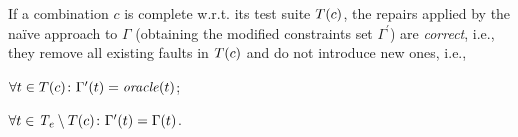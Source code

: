\begin{tikzborder}{\cite{Gargantini16:validation}}
\begin{tikzborder}{\cite{gargantini_combinatorial_2017}}
\begin{tikzborder}{\cite{gargantini_combinatorial_2017}}
\begin{tikzborder}{\cite{garn2019}}
\begin{tikzborder}{\cite{arcaini2019achieving}}
\begin{tikzborder}{\cite{arcaini2019varivolution}}
		
		\begin{thm}\label{thm:correctnessNaive}
			If a combination $c$ is complete w.r.t. its test suite $T(c)$, the repairs applied by the na{\"i}ve approach to $\Gamma$ (obtaining the modified constraints set $\Gamma ^\prime$) are {\it correct}, i.e., they remove all existing faults in $T(c)$ and do not introduce new ones, i.e.,
			\begin{compactenum}
				\item $\forall t \in T(c) \colon \Gamma^\prime(t) = \mathit{oracle}(t)$;
				\item $\forall t \in \mathit{T_e} \setminus T(c) \colon \Gamma^\prime(t) = \Gamma(t)$.
			\end{compactenum}
		\end{thm}
		

\end{tikzborder}
\end{tikzborder}
\end{tikzborder}
\end{tikzborder}
\end{tikzborder}
\end{tikzborder}
